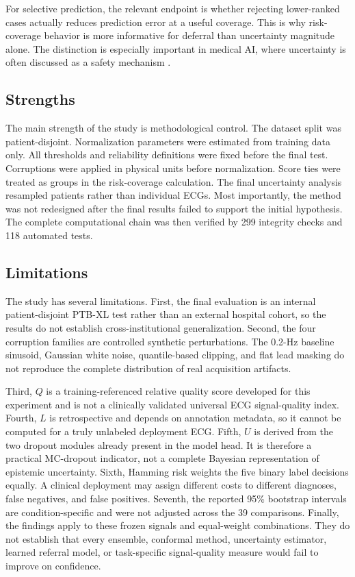\documentclass[journal]{IEEEtran}
\begin{document}
For selective prediction, the relevant endpoint is whether rejecting lower-ranked cases actually reduces prediction error at a useful coverage. This is why risk-coverage behavior is more informative for deferral than uncertainty magnitude alone. The distinction is especially important in medical AI, where uncertainty is often discussed as a safety mechanism \cite{kompa2021second,chua2023uncertainty,goetz2024generalization}.

\subsection{Strengths}
The main strength of the study is methodological control. The dataset split was patient-disjoint. Normalization parameters were estimated from training data only. All thresholds and reliability definitions were fixed before the final test. Corruptions were applied in physical units before normalization. Score ties were treated as groups in the risk-coverage calculation. The final uncertainty analysis resampled patients rather than individual ECGs. Most importantly, the method was not redesigned after the final results failed to support the initial hypothesis. The complete computational chain was then verified by 299 integrity checks and 118 automated tests.

\subsection{Limitations}
The study has several limitations. First, the final evaluation is an internal patient-disjoint PTB-XL test rather than an external hospital cohort, so the results do not establish cross-institutional generalization. Second, the four corruption families are controlled synthetic perturbations. The 0.2-Hz baseline sinusoid, Gaussian white noise, quantile-based clipping, and flat lead masking do not reproduce the complete distribution of real acquisition artifacts.

Third, $Q$ is a training-referenced relative quality score developed for this experiment and is not a clinically validated universal ECG signal-quality index. Fourth, $L$ is retrospective and depends on annotation metadata, so it cannot be computed for a truly unlabeled deployment ECG. Fifth, $U$ is derived from the two dropout modules already present in the model head. It is therefore a practical MC-dropout indicator, not a complete Bayesian representation of epistemic uncertainty. Sixth, Hamming risk weights the five binary label decisions equally. A clinical deployment may assign different costs to different diagnoses, false negatives, and false positives. Seventh, the reported 95\% bootstrap intervals are condition-specific and were not adjusted across the 39 comparisons. Finally, the findings apply to these frozen signals and equal-weight combinations. They do not establish that every ensemble, conformal method, uncertainty estimator, learned referral model, or task-specific signal-quality measure would fail to improve on confidence.
\end{document}
